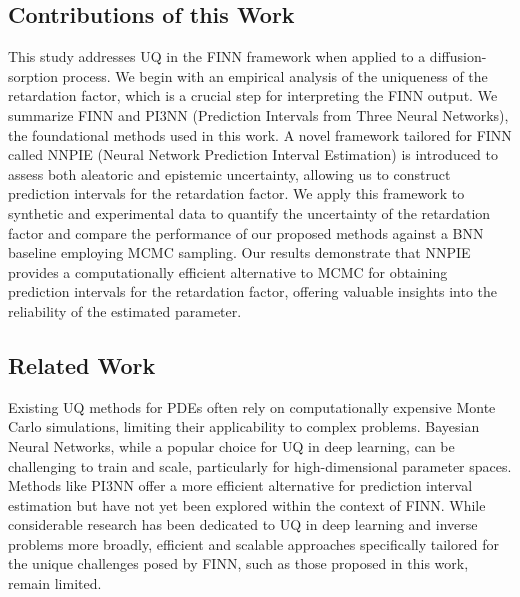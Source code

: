 \subsection{Contributions of this Work}
This study addresses UQ in the FINN framework when applied to a diffusion-sorption process. We begin with an empirical analysis of the uniqueness of the retardation factor, which is a crucial step for interpreting the FINN output. We summarize FINN and PI3NN (Prediction Intervals from Three Neural Networks), the foundational methods used in this work.
A novel framework tailored for FINN called NNPIE (Neural Network Prediction Interval Estimation) is introduced to assess both aleatoric and epistemic uncertainty, allowing us to construct prediction intervals for the retardation factor.
We apply this framework to synthetic and experimental data to quantify the uncertainty of the retardation factor and compare the performance of our proposed methods against a BNN baseline employing MCMC sampling. Our results demonstrate that NNPIE provides a computationally efficient alternative to MCMC for obtaining prediction intervals for the retardation factor, offering valuable insights into the reliability of the estimated parameter.


\subsection{Related Work}
Existing UQ methods for PDEs often rely on computationally expensive Monte Carlo simulations, limiting their applicability to complex problems. Bayesian Neural Networks, while a popular choice for UQ in deep learning, can be challenging to train and scale, particularly for high-dimensional parameter spaces. Methods like PI3NN offer a more efficient alternative for prediction interval estimation but have not yet been explored within the context of FINN. While considerable research has been dedicated to UQ in deep learning and inverse problems more broadly, efficient and scalable approaches specifically tailored for the unique challenges posed by FINN, such as those proposed in this work, remain limited. %


